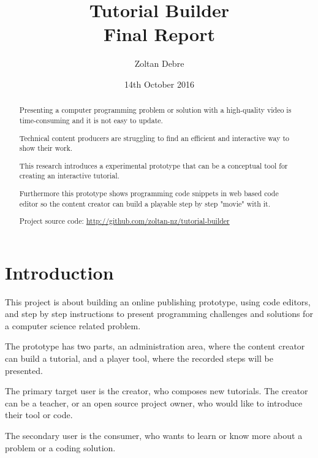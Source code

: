 \documentclass[12pt, a4paper, oneside, openright, medskipamount]{report}
\title{%
Tutorial Builder \\
\large Final Report}
\author{Zoltan Debre}
\date{14th October 2016}
\begin{document}
\frontmatter

\begin{abstract}

Presenting a computer programming problem or solution with a high-quality video is time-consuming and it is not easy to update.

Technical content producers are struggling to find an efficient and interactive way to show their work.

This research introduces a experimental prototype that can be a conceptual tool for creating an interactive tutorial.

Furthermore this prototype shows programming code snippets in web based code editor so the content creator can build a playable step by step "movie" with it.

Project source code: \url{http://github.com/zoltan-nz/tutorial-builder}

\end{abstract}



\maketitle

\tableofcontents


\mainmatter


\chapter{Introduction}

This project is about building an online publishing prototype, using code editors, and step by step instructions to present programming challenges and solutions for a computer science related problem.

The prototype has two parts, an administration area, where the content creator can build a tutorial, and a player tool, where the recorded steps will be presented.

The primary target user is the creator, who composes new tutorials. The creator can be a teacher, or an open source project owner, who would like to introduce their tool or code.

The secondary user is the consumer, who wants to learn or know more about a problem or a coding solution.
\end{document}
